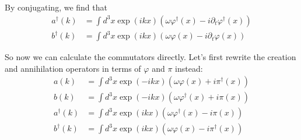 \documentclass[fontsize=11pt]{scrartcl} %
\numberwithin{equation}{section} %
\numberwithin{figure}{section} %
\numberwithin{table}{section} %
\begin{document}
By conjugating, we find that
\[
    \begin{aligned}
        a^{\dagger}(k) &= \int d^3x\exp(ikx)\left( \omega\varphi^{\dagger}(x) -
        i\partial_t\varphi^{\dagger}(x)\right)\\
                b^{\dagger}(k) &= \int d^3x\exp(ikx)\left( \omega\varphi(x) -
                        i\partial_t\varphi(x)\right)
    \end{aligned}
\]

So now we can calculate the commutators directly. Let's first rewrite the
creation and annihilation operators in terms of $\varphi$ and $\pi$ instead:
\[
    \begin{aligned}
        a(k) &= \int d^3x\exp(-ikx)\left( \omega\varphi(x) 
        + i\pi^{\dagger}(x)\right)\\
        b(k) &= \int d^3x\exp(-ikx)\left( \omega\varphi^{\dagger}(x)
            + i\pi(x)\right)\\
        a^{\dagger}(k) &= \int d^3x\exp(ikx)\left( \omega\varphi^{\dagger}(x) -
            i\pi(x)\right)\\
        b^{\dagger}(k) &= \int d^3x\exp(ikx)\left( \omega\varphi(x) -
        i\pi^{\dagger}(x)\right)
    \end{aligned}
\]
\end{document}

